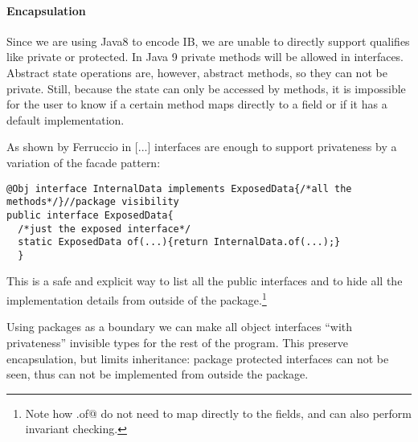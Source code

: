 \begin{comment}
@Obj interface Person$ extends Person{//will be further expanded by @Obj
  void name(String val);
  default void rename(String newName){ if(/*valid name*/){ this.name(val);}}
  String name();
  static Person from(String val){ if(/*valid name*/){return Person$.of(val);}
    throw /*invalid name*/}  }
\end{lstlisting}

This is not a perfect solution, since
\Q@Person$@ can still be seen inside the \Q@Person@ package and heirs of
\Q@Person$@,
however it is surprising we achieve such of a good result without any language
support for privacy in interfaces.
\end{comment}

\paragraph{Encapsulation} %
Since we are using Java8 to encode IB, we are unable to directly support qualifies
like private or protected. In Java 9 private methods will be allowed in
interfaces. Abstract state operations are, however, abstract methods,
so they can not be private.
Still, because the state can only be accessed by methods, it 
is impossible for the user to know if a certain method maps directly to a field
or if it has a default implementation. 

As shown by Ferruccio in [...] interfaces are enough to support privateness by a
 variation of the facade pattern:
\begin{lstlisting}
@Obj interface InternalData implements ExposedData{/*all the methods*/}//package visibility
public interface ExposedData{
  /*just the exposed interface*/
  static ExposedData of(...){return InternalData.of(...);}
  }
\end{lstlisting}

This is a safe and explicit way to list all the public interfaces and to hide all the implementation
details from outside of the package.\footnote{
Note how \Q@ExposedData.of@ do not need to map directly to the fields, and can also perform 
invariant checking.}

Using packages as a boundary we can make all object interfaces ``with privateness''
invisible types for the rest of the program.
This preserve encapsulation, but limits inheritance:
package protected interfaces can not be seen,
thus can not be implemented from outside the package.

